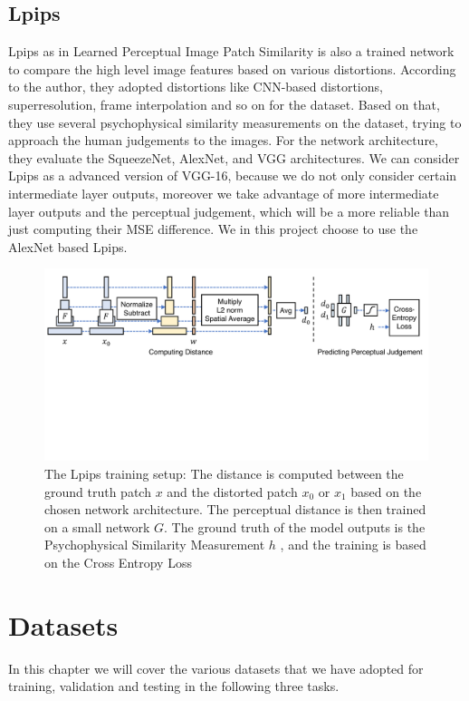 \documentclass[a4paper,12pt,twoside]{report}
\begin{document}
\section{Lpips}
Lpips as in Learned Perceptual Image Patch Similarity\cite{zhang2018perceptual} is also a trained network to compare the high level image features based on various distortions. According to the author, they adopted distortions like CNN-based distortions, superresolution, frame interpolation and so on for the dataset. Based on that, they use several psychophysical similarity measurements on the dataset, trying to approach the human judgements to the images. For the network architecture, they evaluate the SqueezeNet, AlexNet, and VGG architectures. We can consider Lpips as a advanced version of VGG-16, because we do not only consider certain intermediate layer outputs, moreover we take advantage of more intermediate layer outputs and the perceptual judgement, which will be a more reliable than just computing their MSE difference. We in this project choose to use the AlexNet based Lpips.
\begin{figure}
\centering
\includegraphics[width=1.0\textwidth]{network_lpips.pdf}
\caption{The Lpips training setup: The distance is computed between the ground truth patch $x$ and the distorted patch $x_0$ or $x_1$ based on the chosen network architecture. The perceptual distance is then trained on a small network $G$. The ground truth of the model outputs is the Psychophysical Similarity Measurement $h$ , and the training is based on the Cross Entropy Loss\cite{zhang2018perceptual}}
\end{figure}







\chapter{Datasets}
In this chapter we will cover the various datasets that we have adopted for training, validation and testing in the following three tasks.
\end{document}
